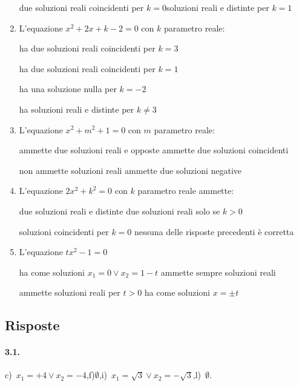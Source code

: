\begin{esercizio}[\Ast]
\begin{enumerate}
\boxC\; due soluzioni reali coincidenti per $ k=0 $\quad\boxD\;soluzioni reali e distinte per $ k=1 $

	\item L'equazione $x^{2} + 2x + k-2 = 0$ con $ k $ parametro reale:

\boxA\quad ha due soluzioni reali coincidenti per $ k=3 $

\boxB\quad ha due soluzioni reali coincidenti per $ k=1 $

\boxC\quad ha una soluzione nulla per $k =-2$

\boxD\quad ha soluzioni reali e distinte per $k \neq 3$

	\item L'equazione $x^{2} + m^{2} + 1 = 0$ con $m$ parametro reale:

\boxA\; ammette due soluzioni reali e opposte\quad\boxB\; ammette due soluzioni coincidenti

\boxC\; non ammette soluzioni reali\quad\boxD\; ammette due soluzioni negative

	\item L'equazione $2x^{2} + k^{2} = 0$ con $k$ parametro reale ammette:

\boxA\; due soluzioni reali e distinte\quad\boxB\; due soluzioni reali solo se $k>0$

\boxC\; soluzioni coincidenti per $k = 0$\quad\boxD\; nessuna delle risposte precedenti è corretta

	\item L'equazione $tx^{2}-1 = 0$

\boxA\; ha come soluzioni $x_{1} = 0 \vee x_{2} = 1-t$\quad\boxB\; ammette sempre soluzioni reali

\boxC\; ammette soluzioni reali per $t > 0$\quad\boxD\; ha come soluzioni $x = \pm t$

\end{enumerate}
\end{esercizio}

\subsection{Risposte}
\paragraph{3.1.} c)~$x_{1}=+4 \vee x_{2}=-4$,\quad f)$\emptyset$,\quad i)~$x_{1} = \sqrt{3} \vee x _{2} = - \sqrt{3}$,\quad l)~$\emptyset$.

